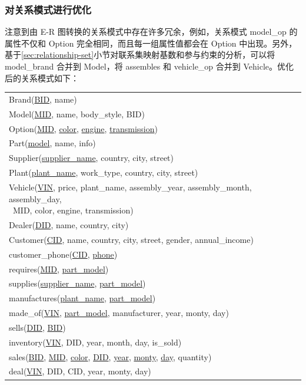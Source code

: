 \documentclass[hyperref,a4paper,UTF8]{ctexart}
\begin{document}
\subsubsection{对关系模式进行优化\label{sec:对关系模式进行优化}}

注意到由 E-R 图转换的关系模式中存在许多冗余，例如，关系模式 model\_op 的属性不仅和 Option 完全相同，而且每一组属性值都会在 Option 中出现。另外，基于\ref{sec:relationship-set}小节对联系集映射基数和参与约束的分析，可以将 model\_brand 合并到 Model，将 assembles 和 vehicle\_op 合并到 Vehicle。优化后的关系模式如下：

\begin{center}
    \begin{tabular}{l}
        Brand(\underline{BID}, name)\\
        Model(\underline{MID}, name, body\_style, BID)\\
        Option(\underline{MID}, \underline{color}, \underline{engine}, \underline{transmission})\\
        Part(\underline{model}, name, info)\\
        Supplier(\underline{supplier\_name}, country, city, street)\\
        Plant(\underline{plant\_name}, work\_type, country, city, street)\\
        \makecell[l]{Vehicle(\underline{VIN}, price, plant\_name, assembly\_year, assembly\_month, assembly\_day, \\ \qquad \quad \  MID, color, engine, transmission)}\\
        Dealer(\underline{DID}, name, country, city)\\
        Customer(\underline{CID}, name, country, city, street, gender, annual\_income)\\
        customer\_phone(\underline{CID}, \underline{phone})\\
        requires(\underline{MID}, \underline{part\_model})\\
        supplies(\underline{supplier\_name}, \underline{part\_model})\\
        manufactures(\underline{plant\_name}, \underline{part\_model})\\
        made\_of(\underline{VIN}, \underline{part\_model}, manufacturer, year, monty, day)\\
        sells(\underline{DID}, \underline{BID})\\
        inventory(\underline{VIN}, DID, year, month, day, is\_sold)\\
        sales(\underline{BID}, \underline{MID}, \underline{color}, \underline{DID}, \underline{year}, \underline{monty}, \underline{day}, quantity)\\
        deal(\underline{VIN}, DID, CID, year, monty, day)
    \end{tabular}
\end{center}
\end{document}
